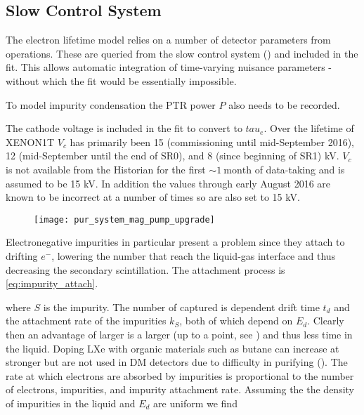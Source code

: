\subsection{Slow Control System}
\label{subsec:electron_lifetime_model_slow_control}
The electron lifetime model relies on a number of detector parameters from operations.  These are queried from the slow control system
() and included in the fit.  This allows automatic integration of time-varying nuisance
parameters - without which the fit would be essentially impossible.

To model impurity condensation the PTR power $P$ also needs to be recorded.

The cathode voltage is included in the fit to convert \il to $tau_e$.  Over the lifetime of XENON1T $V_c$ has primarily been 15
(commissioning until mid-September 2016), 12 (mid-September until the end of SR0), and 8 (since beginning of SR1) kV.  $V_c$ is not
available from the Historian for the first ${\sim} 1\ \mathrm{month}$ of data-taking and is assumed to be 15 kV.  In addition the values
through early August 2016 are known to be incorrect at a number of times so are also set to 15 kV.

\begin{figure}
\centering
\texttt{[image: pur\_system\_mag\_pump\_upgrade]}
\caption{}
\label{fig:mag_pump}
\end{figure}

Electronegative impurities
in particular present a problem
since they attach to drifting $e^{-}$,
lowering the number that reach the liquid-gas interface and thus decreasing the secondary scintillation.  The attachment process
is \eqref{eq:impurity_attach}.

\noindent where $S$ is the impurity.  The number of \electron captured is dependent drift time $t_{d}$ and the
attachment rate of
the impurities $k_{S}$, both of which depend on $E_{d}$.  Clearly then an advantage of larger
\efields is a larger
\vd (up to a point, see ) and thus less time in the liquid.  Doping LXe with organic materials such as butane
can increase \vd at stronger
\efields but are not used in DM detectors due to difficulty in purifying ().  The rate at which electrons are
absorbed by impurities is proportional to the number of electrons, impurities, and impurity attachment rate.  Assuming the the density
of impurities in the liquid and $E_{d}$ are uniform we find

